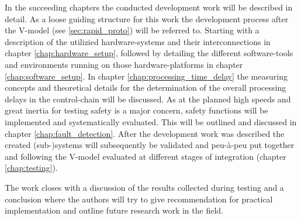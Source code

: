 \documentclass[ExampleMasters.tex]{subfiles}
\begin{document}
In the succeeding chapters the conducted development work will be described in detail. As a loose guiding structure for this work the development process after the V-model (see \ref{sec:rapid_proto}) will be referred to. Starting with a description of the utilizied hardware-systems and their interconnections in chapter \ref{chap:hardware_setup}, followed by detailing the different software-tools and environments running on those hardware-platforms in chapter \ref{chap:software_setup}. In chapter \ref{chap:processing_time_delay} the measuring concepts and theoretical details for the determination of the overall processing delays in the control-chain will be discussed. As at the planned high speeds and great inertia for testing safety is a major concern, safety functions will be implemented and systematically evaluated. This will be outlined and discussed in chapter \ref{chap:fault_detection}. After the development work was described the created (sub-)systems will subsequently be validated and peu-\`{a}-peu put together and following the V-model evaluated at different stages of integration (chapter \ref{chap:testing}). 

The work closes with a discussion of the results collected during testing and a conclusion where the authors will try to give recommendation for practical implementation and outline future research work in the field.
\end{document}
